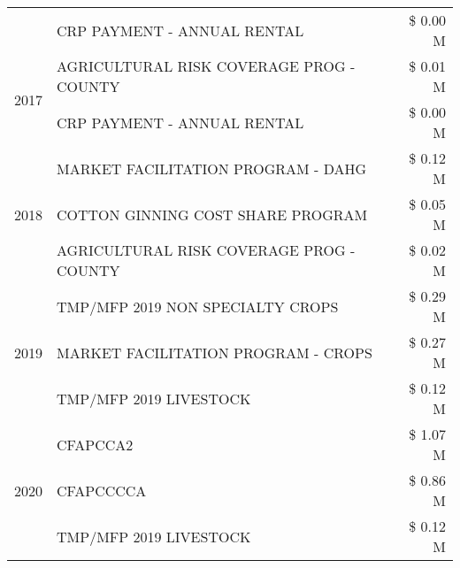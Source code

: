 \begin{tabular}{llr}
 & CRP PAYMENT - ANNUAL RENTAL & \$ 0.00 M \\
\cline{1-3}
\multirow[t]{2}{*}{2017} & AGRICULTURAL RISK COVERAGE PROG - COUNTY & \$ 0.01 M \\
 & CRP PAYMENT - ANNUAL RENTAL & \$ 0.00 M \\
\cline{1-3}
\multirow[t]{3}{*}{2018} & MARKET FACILITATION PROGRAM - DAHG & \$ 0.12 M \\
 & COTTON GINNING COST SHARE PROGRAM & \$ 0.05 M \\
 & AGRICULTURAL RISK COVERAGE PROG - COUNTY & \$ 0.02 M \\
\cline{1-3}
\multirow[t]{3}{*}{2019} & TMP/MFP 2019 NON SPECIALTY CROPS & \$ 0.29 M \\
 & MARKET FACILITATION PROGRAM - CROPS & \$ 0.27 M \\
 & TMP/MFP 2019 LIVESTOCK & \$ 0.12 M \\
\cline{1-3}
\multirow[t]{3}{*}{2020} & CFAPCCA2 & \$ 1.07 M \\
 & CFAPCCCCA & \$ 0.86 M \\
 & TMP/MFP 2019 LIVESTOCK & \$ 0.12 M \\
\cline{1-3}
\bottomrule
\end{tabular}
